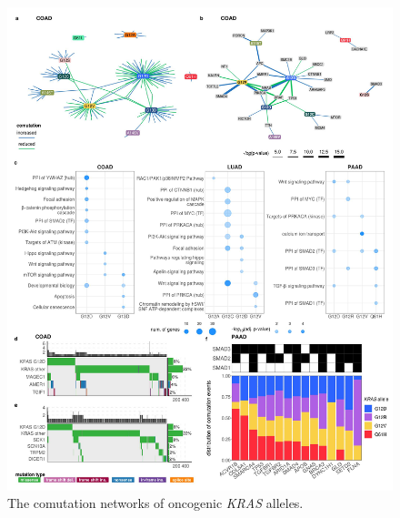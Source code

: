 \documentclass[english, 10pt, letterpaper]{article}
\newcommand{\KRAS}{\emph{KRAS}}
\begin{document}
\begin{figure}[h!]
\centering
\includegraphics[width=176mm]{figures/Fig_3.jpeg}
\caption{The comutation networks of oncogenic \KRAS{} alleles.}
\label{fig:comutation-main}
\end{figure}
\newpage
\end{document}
